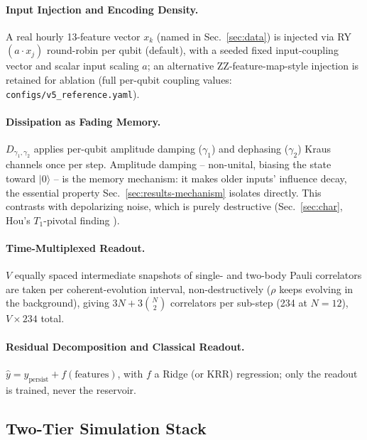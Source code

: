 \documentclass[11pt,twocolumn]{article}
\begin{document}
\paragraph{Input Injection and Encoding Density.}

A real hourly 13-feature vector $x_k$ (named in Sec.~\ref{sec:data}) is injected via
RY$(a\cdot x_j)$ round-robin per qubit (default), with a seeded fixed input-coupling vector and
scalar input scaling $a$; an alternative ZZ-feature-map-style injection is retained for ablation
(full per-qubit coupling values: \texttt{configs/v5\_reference.yaml}).

\paragraph{Dissipation as Fading Memory.}

$D_{\gamma_1,\gamma_2}$ applies per-qubit amplitude damping ($\gamma_1$) and dephasing
($\gamma_2$) Kraus channels once per step. Amplitude damping -- non-unital, biasing the state
toward $|0\rangle$ -- is the memory mechanism: it makes older inputs' influence decay, the
essential property Sec.~\ref{sec:results-mechanism} isolates directly. This contrasts with
depolarizing noise, which is purely destructive (Sec.~\ref{sec:char}, Hou's $T_1$-pivotal
finding \cite{hou}).

\paragraph{Time-Multiplexed Readout.}

$V$ equally spaced intermediate snapshots of single- and two-body Pauli correlators are taken per
coherent-evolution interval, non-destructively ($\rho$ keeps evolving in the background), giving
$3N+3\binom{N}{2}$ correlators per sub-step (234 at $N{=}12$), $V\times234$ total.

\paragraph{Residual Decomposition and Classical Readout.}

$\hat y = y_{\text{persist}} + f(\text{features})$, with $f$ a Ridge (or KRR) regression; only the
readout is trained, never the reservoir.

\subsection{Two-Tier Simulation Stack}
\label{sec:stack}
\end{document}
